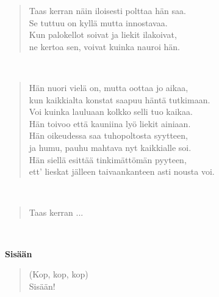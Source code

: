 \noindent\begin{minipage}{\linewidth}
\begin{verse}
	Taas kerran näin iloisesti polttaa hän saa.\\
	Se tuttuu on kyllä mutta innostavaa.\\
	Kun palokellot soivat ja liekit ilakoivat,\\
	ne kertoa sen, voivat kuinka nauroi hän.\\
\end{verse}
\end{minipage}\\[10pt]
\noindent\begin{minipage}{\linewidth}
\begin{verse}
	Hän nuori vielä on, mutta oottaa jo aikaa,\\
	kun kaikkialta konstat saapuu häntä tutkimaan.\\
	Voi kuinka lauluaan kolkko selli tuo kaikaa.\\
	Hän toivoo että kauniina lyö liekit ainiaan.\\
	Hän oikeudessa saa tuhopoltosta syytteen,\\
	ja humu, pauhu mahtava nyt kaikkialle soi.\\
	Hän siellä esittää tinkimättömän pyyteen,\\
	ett' lieskat jälleen taivaankanteen asti nousta voi.\\
\end{verse}
\end{minipage}\\[10pt]
\noindent\begin{minipage}{\linewidth}
\begin{verse}
	Taas kerran ...\\
\end{verse}
\end{minipage}\\[10pt]
%
%
\noindent\begin{minipage}{\linewidth}
\vspace{5pt}
\parbox[t]{0.85\linewidth}{\raggedright {\large\bf Sisään}\\[6pt]}
\begin{verse}
	(Kop, kop, kop)\\
	Sisään!\\
\end{verse}
\end{minipage}\\[10pt]
